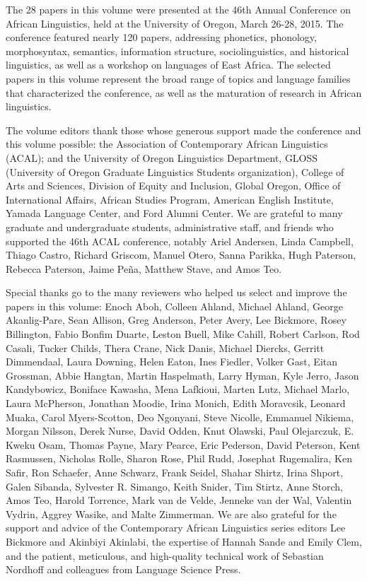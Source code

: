 \largerpage
The 28 papers in this volume were presented at the 46th Annual Conference on African Linguistics, held at the University of Oregon, March 26-28, 2015. The conference featured nearly 120 papers, addressing phonetics, phonology, morphosyntax, semantics, information structure, sociolinguistics, and historical linguistics, as well as a workshop on  languages of East Africa. The selected papers in this volume represent the broad range of topics and language families that characterized the conference, as well as the maturation of research in African linguistics.

The volume editors thank those whose generous support made the conference and this volume possible: the Association of Contemporary African Linguistics (ACAL); 
and the University of Oregon Linguistics Department, 
 GLOSS (University of Oregon Graduate Linguistics Students organization), 
 College of Arts and Sciences, 
 Division of Equity and Inclusion, 
 Global Oregon, 
 Office of International Affairs,
 African Studies Program,
 American English Institute, 
 Yamada Language Center, 
 and Ford Alumni Center.
We are grateful to many graduate and undergraduate students, administrative staff, and friends who supported the 46th ACAL conference, notably 
  Ariel Andersen, 
  Linda Campbell, 
  Thiago Castro,
  Richard Griscom, 
  Manuel Otero,
  Sanna Parikka, 
  Hugh Paterson, 
  Rebecca Paterson, 
  Jaime Pe\~na,
  Matthew Stave, 
  and Amos Teo.

Special thanks go to the many reviewers who helped us select and improve the papers in this volume: 
Enoch Aboh,
Colleen Ahland,
Michael Ahland,
George Akanlig-Pare,
Sean Allison,
Greg Anderson,
Peter Avery,
Lee Bickmore,
Rosey Billington,
Fabio Bonfim Duarte,
Leston Buell,
Mike Cahill,
Robert Carlson,
Rod Casali,
Tucker Childs,
Thera Crane,
Nick Danis,
Michael Diercks,
Gerritt Dimmendaal,
Laura Downing,
Helen Eaton,
Ines Fiedler,
Volker Gast,
Eitan Grossman,
Abbie Hangtan,
Martin Haspelmath,
Larry Hyman,
Kyle Jerro,
Jason Kandybowicz,
Boniface Kawasha,
Mena Lafkioui,
Marten Lutz,
Michael Marlo,
Laura McPherson,
Jonathan Moodie,
Irina Monich,
Edith Moravcsik,
Leonard Muaka,
Carol Myers-Scotton,
Deo Ngonyani,
Steve Nicolle,
Emmanuel Nikiema,
Morgan Nilsson,
Derek Nurse,
David Odden,
Knut Olawski,
Paul Olejarczuk,
E. Kweku Osam,
Thomas Payne,
Mary Pearce,
Eric Pederson,
David Peterson,
Kent Rasmussen,
Nicholas Rolle,
Sharon Rose,
Phil Rudd,
Josephat Rugemalira,
Ken Safir,
Ron Schaefer,
Anne Schwarz,
Frank Seidel,
Shahar Shirtz,
Irina Shport,
Galen Sibanda,
Sylvester R. Simango,
Keith Snider,
Tim Stirtz,
Anne Storch,
Amos Teo,
Harold Torrence,
Mark van de Velde,
Jenneke van der Wal,
Valentin Vydrin,
Aggrey Wasike,
and Malte Zimmerman.
 We are also grateful for the support and advice of the Contemporary African Linguistics series editors Lee Bickmore and Akinbiyi Akinlabi, the expertise of Hannah Sande and Emily Clem, and the patient, meticulous, and high-quality technical work of Sebastian Nordhoff and colleagues from Language Science Press. 